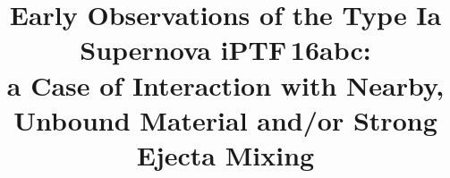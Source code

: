 \documentclass[twocolumn]{aastex61}
\newcommand{\abc}{iPTF\,16abc}
\begin{document}
\title{Early Observations of the Type Ia Supernova \abc:\\
a Case of Interaction with Nearby, Unbound Material and/or Strong Ejecta Mixing}


\end{document}
